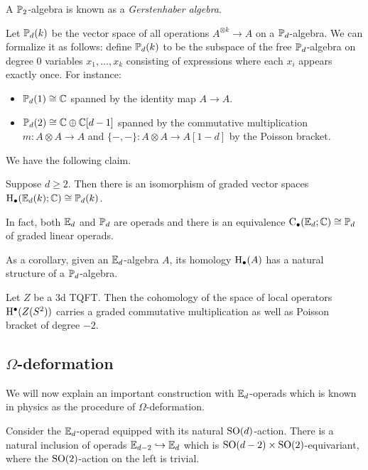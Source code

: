 \begin{remark}
A $\mathbb{P}_2$-algebra is known as a \emph{Gerstenhaber algebra}.
\end{remark}

Let $\mathbb{P}_d(k)$ be the vector space of all operations $A^{\otimes k}\rightarrow A$ on a $\mathbb{P}_d$-algebra. We can formalize it as follows: define $\mathbb{P}_d(k)$ to be the subspace of the free $\mathbb{P}_d$-algebra on degree 0 variables $x_1, \dots, x_k$ consisting of expressions where each $x_i$ appears exactly once. For instance:
\begin{itemize}
\item $\mathbb{P}_d(1)\cong \mathbb{C}$ spanned by the identity map $A\rightarrow A$.
\item $\mathbb{P}_d(2)\cong \mathbb{C}\oplus \mathbb{C}[d-1]$ spanned by the commutative multiplication $m\colon A\otimes A\rightarrow A$ and $\{-, -\}\colon A\otimes A\rightarrow A[1-d]$ by the Poisson bracket.
\end{itemize}

We have the following claim.

\begin{defn}
Suppose $d\geq 2$. Then there is an isomorphism of graded vector spaces $\mathrm{H}_\bullet(\mathbb{E}_d(k); \mathbb{C})\cong \mathbb{P}_d(k)$.
\end{defn}

\begin{remark}
In fact, both $\mathbb{E}_d$ and $\mathbb{P}_d$ are operads and there is an equivalence $\mathrm{C}_\bullet(\mathbb{E}_d; \mathbb{C})\cong \mathbb{P}_d$ of graded linear operads.
\end{remark}

As a corollary, given an $\mathbb{E}_d$-algebra $A$, its homology $\mathrm{H}_\bullet(A)$ has a natural structure of a $\mathbb{P}_d$-algebra.

\begin{example}
Let $Z$ be a 3d TQFT. Then the cohomology of the space of local operators $\mathrm{H}^\bullet(Z(S^2))$ carries a graded commutative multiplication as well as Poisson bracket of degree $-2$.
\end{example}

\subsection{$\Omega$-deformation}

We will now explain an important construction with $\mathbb{E}_d$-operads which is known in physics as the procedure of $\Omega$-deformation.

Consider the $\mathbb{E}_d$-operad equipped with its natural $\mathrm{SO}(d)$-action. There is a natural inclusion of operads $\mathbb{E}_{d-2}\hookrightarrow \mathbb{E}_d$ which is $\mathrm{SO}(d-2)\times \mathrm{SO}(2)$-equivariant, where the $\mathrm{SO}(2)$-action on the left is trivial.

